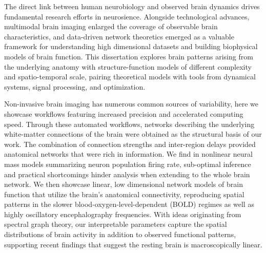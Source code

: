The direct link between human neurobiology and observed brain dynamics drives fundamental research efforts in neurosience. Alongside technological advances, multimodal brain imaging enlarged the coverage of observable brain characteristics, and data-driven network theoretics emerged as a valuable framework for understanding high dimensional datasets and building biophysical models of brain function. This dissertation explores brain patterns arising from the underlying anatomy with structure-function models of different complexity and spatio-temporal scale, pairing theoretical models with tools from dynamical systems, signal processing, and optimization. 

Non-invasive brain imaging has numerous common sources of variability, here we showcase workflows featuring increased precision and accelerated computing speed. Through these automated workflows, networks describing the underlying white-matter connections of the brain were obtained as the structural basis of our work. The combination of connection strengths and inter-region delays provided anatomical networks that were rich in information. We find in nonlinear neural mass models summarizing neuron population firing rate, sub-optimal inference and practical shortcomings hinder analysis when extending to the whole brain network. We then showcase linear, low dimensional network models of brain function that utilize the brain's anatomical connectivity, reproducing spatial patterns in the slower blood-oxygen-level-dependent (BOLD) regimes as well as highly oscillatory encephalography frequencies. With ideas originating from spectral graph theory, our interpretable parameters capture the spatial distributions of brain activity in addition to observed functional patterns, supporting recent findings that suggest the resting brain is macroscopically linear.